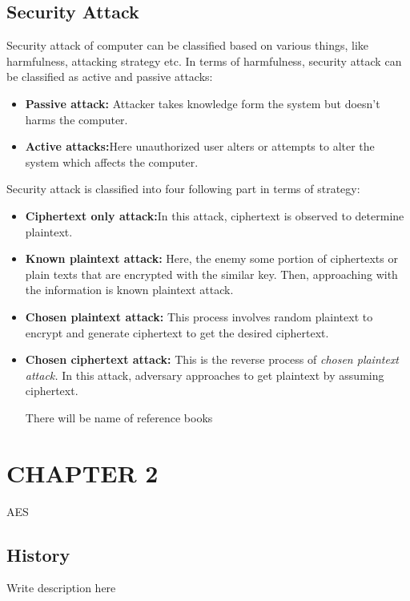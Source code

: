 \documentclass[a4paper,12pt]{article}
\newcommand{\R}{\color{red}}
\newcommand{\Or}{\color{orange}}
\begin{document}
	\subsection{Security Attack}
	Security attack of computer can be classified based on various things, like harmfulness, attacking strategy etc.
	In terms of harmfulness, security attack can be classified as active and passive attacks:
	\begin{itemize}
		\item {\bf Passive attack:} Attacker takes knowledge form the system but doesn't harms the computer.
		\item {\bf Active attacks:}Here unauthorized user alters or attempts to alter the system which affects the computer.\\
	\end{itemize}
	Security attack is classified into four following part in terms of strategy:
	\begin{itemize}
		\item {\bf Ciphertext only attack:}In this attack, ciphertext is observed to determine plaintext.
		\item {\bf Known plaintext attack:} Here, the enemy some portion of
			ciphertexts or plain texts that are encrypted with the similar key. Then, approaching with the information is known plaintext attack.
		\item {\bf Chosen plaintext attack:} This process involves random plaintext to encrypt and generate ciphertext to get the desired ciphertext. 
		\item {\bf Chosen ciphertext attack:} This is the reverse process of {\it chosen plaintext attack.} In this attack, adversary approaches to get plaintext by assuming ciphertext.
		
		{\R There will be name of reference books}
		
	\end{itemize}
	\section{\Large CHAPTER 2}
	\begin{center}{\Huge\Or\sc AES}\end{center}
	\subsection{History}
			Write description here
\end{document}
